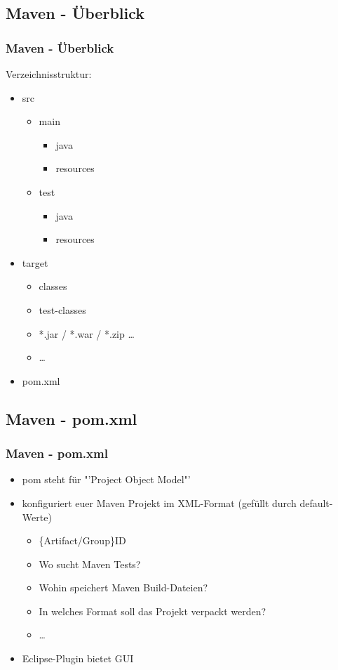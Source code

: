\documentclass[18pt]{beamer}
\begin{document}
	\subsection{Maven - Überblick}
	\begin{frame}
		\frametitle{Maven - Überblick}
		Verzeichnisstruktur:
		\begin{itemize}
			\item src
			\begin{itemize}
				\item main
				\begin{itemize}
					\item java
					\item resources
				\end{itemize}
				\pause
				\item test
				\begin{itemize}
					\item java
					\item resources
				\end{itemize}
			\end{itemize}
			\pause
			\item target
			\begin{itemize}
				\item classes
				\item test-classes
				\item *.jar / *.war / *.zip \dots
				\item \dots
			\end{itemize}
			\pause
			\item pom.xml
		\end{itemize}
	\end{frame}
	
	\subsection{Maven - pom.xml}
	\begin{frame}
		\frametitle{Maven - pom.xml}
		\begin{itemize}
			\item pom steht für "'Project Object Model"'
			\item konfiguriert euer Maven Projekt im XML-Format (gefüllt durch default-Werte)
			\begin{itemize}
				\item \{Artifact/Group\}ID \pause 
				\item Wo sucht Maven Tests? \pause
				\item Wohin speichert Maven Build-Dateien? \pause
				\item In welches Format soll das Projekt verpackt werden? \pause
				\item \dots
			\end{itemize}
			\item Eclipse-Plugin bietet GUI
		\end{itemize}
	\end{frame}
	
\end{document}
